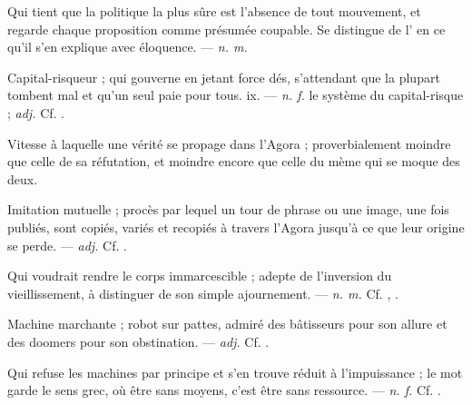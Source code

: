  Qui tient que la politique la plus sûre est l'absence de tout mouvement, et regarde chaque proposition comme présumée coupable. Se distingue de l' en ce qu'il s'en explique avec éloquence. ---  \textit{n. m.}

 Capital-risqueur ; qui gouverne en jetant force dés, s'attendant que la plupart tombent mal et qu'un seul paie pour tous.   ix. ---  \textit{n. f.} le système du capital-risque ;  \textit{adj.} Cf. .

 Vitesse à laquelle une vérité se propage dans l'Agora ; proverbialement moindre que celle de sa réfutation, et moindre encore que celle du mème qui se moque des deux.  

 Imitation mutuelle ; procès par lequel un tour de phrase ou une image, une fois publiés, sont copiés, variés et recopiés à travers l'Agora jusqu'à ce que leur origine se perde.   ---  \textit{adj.} Cf. .

 Qui voudrait rendre le corps immarcescible ; adepte de l'inversion du vieillissement, à distinguer de son simple ajournement. ---  \textit{n. m.} Cf. , .

 Machine marchante ; robot sur pattes, admiré des bâtisseurs pour son allure et des doomers pour son obstination.   ---  \textit{adj.} Cf. .

 Qui refuse les machines par principe et s'en trouve réduit à l'impuissance ; le mot garde le sens grec, où être sans moyens, c'est être sans ressource. ---  \textit{n. f.} Cf. .

